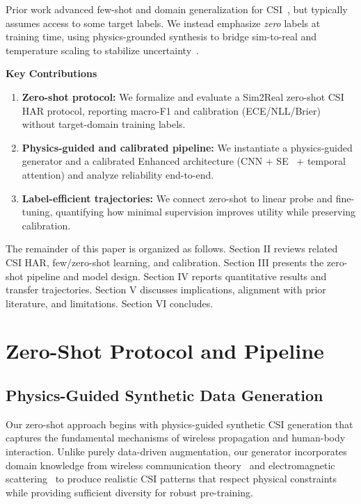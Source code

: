 \documentclass[journal]{IEEEtran}
\begin{document}
Prior work advanced few-shot and domain generalization for CSI~\cite{fewsense2022,airfi2022}, but typically assumes access to some target labels. We instead emphasize \emph{zero} labels at training time, using physics-grounded synthesis to bridge sim-to-real and temperature scaling to stabilize uncertainty~\cite{calibration_guo2017}.

\textbf{Key Contributions}
\begin{enumerate}
  \item \textbf{Zero-shot protocol:} We formalize and evaluate a Sim2Real zero-shot CSI HAR protocol, reporting macro-F1 and calibration (ECE/NLL/Brier) without target-domain training labels.
  \item \textbf{Physics-guided and calibrated pipeline:} We instantiate a physics-guided generator and a calibrated Enhanced architecture (CNN + SE~\cite{se_networks2018} + temporal attention) and analyze reliability end-to-end.
  \item \textbf{Label-efficient trajectories:} We connect zero-shot to linear probe and fine-tuning, quantifying how minimal supervision improves utility while preserving calibration.
\end{enumerate}

The remainder of this paper is organized as follows. Section II reviews related CSI HAR, few/zero-shot learning, and calibration. Section III presents the zero-shot pipeline and model design. Section IV reports quantitative results and transfer trajectories. Section V discusses implications, alignment with prior literature, and limitations. Section VI concludes.

\section{Zero-Shot Protocol and Pipeline}

\subsection{Physics-Guided Synthetic Data Generation}
Our zero-shot approach begins with physics-guided synthetic CSI generation that captures the fundamental mechanisms of wireless propagation and human-body interaction. Unlike purely data-driven augmentation, our generator incorporates domain knowledge from wireless communication theory~\cite{goldsmith2005wireless} and electromagnetic scattering~\cite{mie1908beitrage} to produce realistic CSI patterns that respect physical constraints while providing sufficient diversity for robust pre-training.
\end{document}
